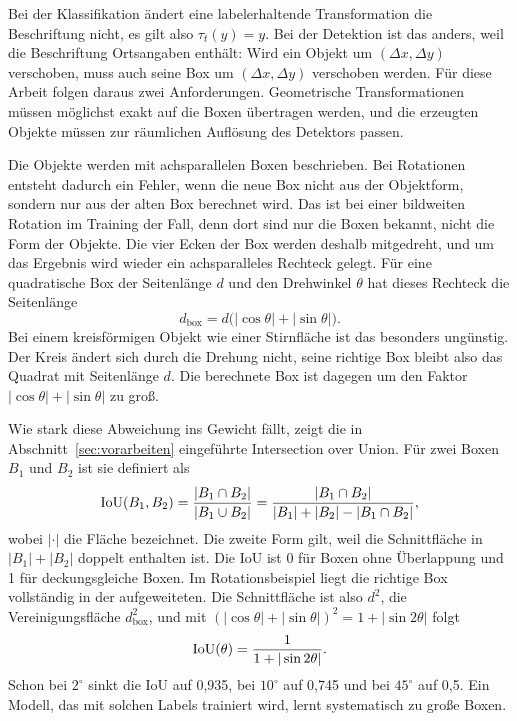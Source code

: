 Bei der Klassifikation ändert eine labelerhaltende Transformation die
Beschriftung nicht, es gilt also $\tau_t(y)=y$. Bei der Detektion ist das
anders, weil die Beschriftung Ortsangaben enthält: Wird ein Objekt um
$(\Delta x,\Delta y)$ verschoben, muss auch seine Box um $(\Delta x,\Delta y)$
verschoben werden. Für diese Arbeit folgen daraus zwei Anforderungen.
Geometrische Transformationen müssen möglichst exakt auf die Boxen übertragen
werden, und die erzeugten Objekte müssen zur räumlichen Auflösung des Detektors
passen.

\label{subsec:aabb-rotation} Die
Objekte werden mit achsparallelen Boxen beschrieben. Bei Rotationen entsteht
dadurch ein Fehler, wenn die neue Box nicht aus der Objektform, sondern nur aus
der alten Box berechnet wird. Das ist bei einer bildweiten Rotation im Training
der Fall, denn dort sind nur die Boxen bekannt, nicht die Form der Objekte. Die
vier Ecken der Box werden deshalb mitgedreht, und um das Ergebnis wird wieder
ein achsparalleles Rechteck gelegt. Für eine quadratische Box der Seitenlänge
$d$ und den Drehwinkel $\theta$ hat dieses Rechteck die Seitenlänge
\begin{equation}
  d_{\mathrm{box}}
  =
  d\bigl(|\cos\theta|+|\sin\theta|\bigr).
  \label{eq:dbox}
\end{equation}
Bei einem kreisförmigen Objekt wie einer Stirnfläche ist das besonders
ungünstig. Der Kreis ändert sich durch die Drehung nicht, seine richtige Box
bleibt also das Quadrat mit Seitenlänge $d$. Die berechnete Box ist dagegen um
den Faktor $|\cos\theta|+|\sin\theta|$ zu groß.

Wie stark diese Abweichung ins Gewicht fällt, zeigt die in
Abschnitt~\ref{sec:vorarbeiten} eingeführte Intersection over Union. Für zwei
Boxen $B_1$ und $B_2$ ist sie definiert als \parencite{everingham2010}
\begin{equation}
  \mathrm{IoU}(B_1, B_2)
  =
  \frac{|B_1 \cap B_2|}{|B_1 \cup B_2|}
  =
  \frac{|B_1 \cap B_2|}{|B_1| + |B_2| - |B_1 \cap B_2|} ,
  \label{eq:ioudef}
\end{equation}
wobei $|\cdot|$ die Fläche bezeichnet. Die zweite Form gilt, weil die
Schnittfläche in $|B_1| + |B_2|$ doppelt enthalten ist. Die IoU ist 0 für Boxen
ohne Überlappung und 1 für deckungsgleiche Boxen. Im Rotationsbeispiel liegt die
richtige Box vollständig in der aufgeweiteten. Die Schnittfläche ist also
$d^2$, die Vereinigungsfläche $d_{\mathrm{box}}^2$, und mit
$(|\cos\theta|+|\sin\theta|)^{2} = 1 + |\sin 2\theta|$ folgt
\begin{equation}
  \mathrm{IoU}(\theta) = \frac{1}{1+|\sin 2\theta|}.
  \label{eq:iou}
\end{equation}
Schon bei $2^{\circ}$ sinkt die IoU auf 0,935, bei $10^{\circ}$ auf 0,745 und
bei $45^{\circ}$ auf 0,5. Ein Modell, das mit solchen Labels trainiert wird,
lernt systematisch zu große Boxen.

